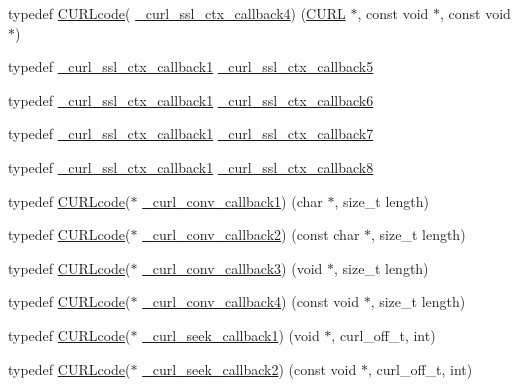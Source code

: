 \begin{DoxyCompactItemize}
\item 
typedef \hyperlink{curl_8h_af0691941698240652e0a391394217951}{C\+U\+R\+Lcode}( \hyperlink{typecheck-gcc_8h_a0347bde422908e03a70feec13cce7119}{\+\_\+curl\+\_\+ssl\+\_\+ctx\+\_\+callback4}) (\hyperlink{curl_8h_ace655e3633b6533591283994d6b5cdda}{C\+U\+R\+L} $\ast$, const void $\ast$, const void $\ast$)
\item 
typedef \hyperlink{typecheck-gcc_8h_a05c55b1e4b35247bffa0fbe08d41ad38}{\+\_\+curl\+\_\+ssl\+\_\+ctx\+\_\+callback1} \hyperlink{typecheck-gcc_8h_ab603023e8514bafb4f44a5f7830beda0}{\+\_\+curl\+\_\+ssl\+\_\+ctx\+\_\+callback5}
\item 
typedef \hyperlink{typecheck-gcc_8h_a05c55b1e4b35247bffa0fbe08d41ad38}{\+\_\+curl\+\_\+ssl\+\_\+ctx\+\_\+callback1} \hyperlink{typecheck-gcc_8h_a6c4618e2a8fc4dac60df619ad8679b5a}{\+\_\+curl\+\_\+ssl\+\_\+ctx\+\_\+callback6}
\item 
typedef \hyperlink{typecheck-gcc_8h_a05c55b1e4b35247bffa0fbe08d41ad38}{\+\_\+curl\+\_\+ssl\+\_\+ctx\+\_\+callback1} \hyperlink{typecheck-gcc_8h_ae2ebdce539e2b1b1348bca8c74831d86}{\+\_\+curl\+\_\+ssl\+\_\+ctx\+\_\+callback7}
\item 
typedef \hyperlink{typecheck-gcc_8h_a05c55b1e4b35247bffa0fbe08d41ad38}{\+\_\+curl\+\_\+ssl\+\_\+ctx\+\_\+callback1} \hyperlink{typecheck-gcc_8h_aeea9c5ad63d27b7ce77216a872b737c6}{\+\_\+curl\+\_\+ssl\+\_\+ctx\+\_\+callback8}
\item 
typedef \hyperlink{curl_8h_af0691941698240652e0a391394217951}{C\+U\+R\+Lcode}($\ast$ \hyperlink{typecheck-gcc_8h_ae23e3d9711c086a0e6d7ed71528af612}{\+\_\+curl\+\_\+conv\+\_\+callback1}) (char $\ast$, size\+\_\+t length)
\item 
typedef \hyperlink{curl_8h_af0691941698240652e0a391394217951}{C\+U\+R\+Lcode}($\ast$ \hyperlink{typecheck-gcc_8h_a0fea29cfe79074a01e621e1a60991ef5}{\+\_\+curl\+\_\+conv\+\_\+callback2}) (const char $\ast$, size\+\_\+t length)
\item 
typedef \hyperlink{curl_8h_af0691941698240652e0a391394217951}{C\+U\+R\+Lcode}($\ast$ \hyperlink{typecheck-gcc_8h_a860c9f69cd61f0d62fe6d1c07f997557}{\+\_\+curl\+\_\+conv\+\_\+callback3}) (void $\ast$, size\+\_\+t length)
\item 
typedef \hyperlink{curl_8h_af0691941698240652e0a391394217951}{C\+U\+R\+Lcode}($\ast$ \hyperlink{typecheck-gcc_8h_ac3b116e3ba589ed78cc87e7c3112ea3a}{\+\_\+curl\+\_\+conv\+\_\+callback4}) (const void $\ast$, size\+\_\+t length)
\item 
typedef \hyperlink{curl_8h_af0691941698240652e0a391394217951}{C\+U\+R\+Lcode}($\ast$ \hyperlink{typecheck-gcc_8h_adebe91c0cf6ae015cc98752e4fe2c363}{\+\_\+curl\+\_\+seek\+\_\+callback1}) (void $\ast$, curl\+\_\+off\+\_\+t, int)
\item 
typedef \hyperlink{curl_8h_af0691941698240652e0a391394217951}{C\+U\+R\+Lcode}($\ast$ \hyperlink{typecheck-gcc_8h_a704fb61f39b18a5fde22c82d59b60865}{\+\_\+curl\+\_\+seek\+\_\+callback2}) (const void $\ast$, curl\+\_\+off\+\_\+t, int)
\end{DoxyCompactItemize}
